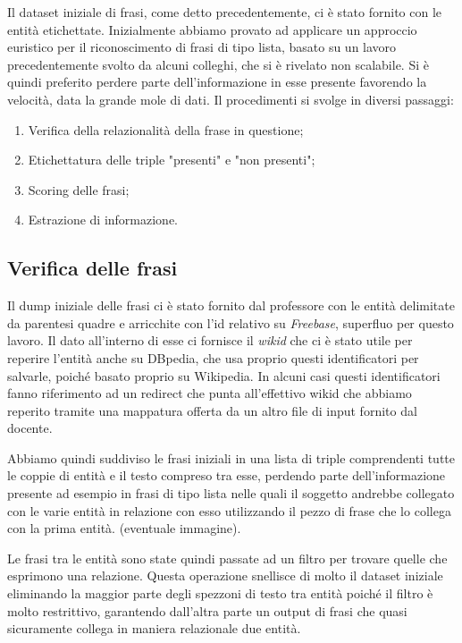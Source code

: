 \documentclass[10pt,a4paper,twocolumn]{article}
\begin{document}
Il dataset iniziale di frasi, come detto precedentemente, ci è stato fornito con le entità etichettate. Inizialmente abbiamo provato ad applicare un approccio euristico per il riconoscimento di frasi di tipo lista, basato su un lavoro precedentemente svolto da alcuni colleghi, che si è rivelato non scalabile. Si è quindi preferito perdere parte dell'informazione in esse presente favorendo la velocità, data la grande mole di dati.
Il procedimenti si svolge in diversi passaggi:
\begin{enumerate}
\item Verifica della relazionalità della frase in questione;
\item Etichettatura delle triple "presenti" e "non presenti";
\item Scoring delle frasi;
\item Estrazione di informazione.
\end{enumerate}

\subsection{Verifica delle frasi}
Il dump iniziale delle frasi ci è stato fornito dal professore con le entità delimitate da parentesi quadre e arricchite con l'id relativo su \textit{Freebase}, superfluo per questo lavoro. Il dato all'interno di esse ci fornisce il \textit{wikid} che ci è stato utile per reperire l'entità anche su DBpedia, che usa proprio questi identificatori per salvarle, poiché basato proprio su Wikipedia. In alcuni casi questi identificatori fanno riferimento ad un redirect che punta all'effettivo wikid che abbiamo reperito tramite una mappatura offerta da un altro file di input fornito dal docente.

Abbiamo quindi suddiviso le frasi iniziali in una lista di triple comprendenti tutte le coppie di entità e il testo compreso tra esse, perdendo parte dell'informazione presente ad esempio in frasi di tipo lista nelle quali il soggetto andrebbe collegato con le varie entità in relazione con esso utilizzando il pezzo di frase che lo collega con la prima entità. (eventuale immagine).

Le frasi tra le entità sono state quindi passate ad un filtro per trovare quelle che esprimono una relazione. Questa operazione snellisce di molto il dataset iniziale eliminando la maggior parte degli spezzoni di testo tra entità poiché il filtro è molto restrittivo, garantendo dall'altra parte un output di frasi che quasi sicuramente collega in maniera relazionale due entità.
\end{document}
